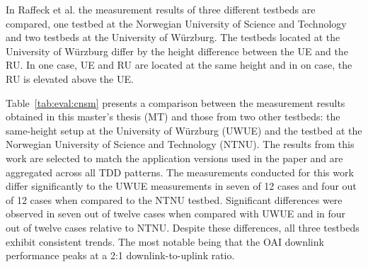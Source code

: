 In Raffeck et al. \cite{raffeck2024parameterizing} the measurement results of three different testbeds are compared,
one testbed at the Norwegian University of Science and Technology and two testbeds at the University of Würzburg.
The testbeds located at the University of Würzburg differ by the height difference between the \gls{UE} and the \gls{RU}.
In one case, \gls{UE} and \gls{RU} are located at the same height and in on case, the \gls{RU} is elevated above the \gls{UE}.

Table~\ref{tab:eval:cnsm} presents a comparison between the measurement results obtained in this master's thesis (MT)
and those from two other testbeds: the same-height setup at the University of Würzburg (UWUE) and the testbed at the
Norwegian University of Science and Technology (NTNU).
The results from this work are selected to match the application versions used in the paper and are aggregated across all \gls{TDD} patterns.
The measurements conducted for this work differ significantly to the UWUE measurements in seven of 12 cases and four out of 12 cases when compared to the NTNU testbed.
Significant differences were observed in seven out of twelve cases when compared with UWUE and in four out of twelve cases relative to NTNU.
Despite these differences, all three testbeds exhibit consistent trends.
The most notable being that the OAI downlink performance peaks at a 2:1 downlink-to-uplink ratio.

